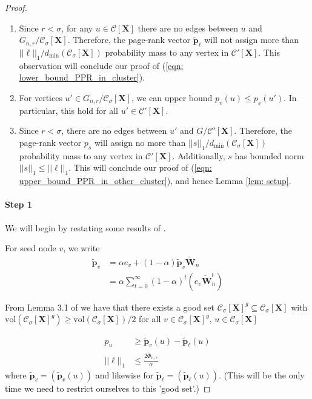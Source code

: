 \documentclass{article}
\newcommand{\vol}{\mathrm{vol}}
\newcommand{\1}{\mathbf{1}}
\newcommand{\pbf}{\mathbf{p}}
\newcommand{\Xbf}{\mathbf{X}}
\newcommand{\Wbf}{\mathbf{W}}
\newcommand{\Cset}{\mathcal{C}}
\newcommand{\Csig}{\Cset_{\sigma}}
\theoremstyle{aldenthm}
\begin{document}
\begin{proof}
\begin{enumerate}
		\item Since $r < \sigma$, for any $u \in \Cset[\Xbf]$ there are no edges between $u$ and $G_{n,r} / \Csig[\Xbf]$. Therefore, the page-rank vector $\widetilde{\pbf}_{\ell}$ will not assign more than $||\ell||_1 / d_{\min}(\Csig[\Xbf])$ probability mass to any vertex in $\Cset'[\Xbf]$. This observation will conclude our proof of (\ref{eqn: lower_bound_PPR_in_cluster}).
		\item For vertices $u' \in G_{n,r} / \Csig[\Xbf]$, we can upper bound $p_v(u) \leq p_s(u')$. In particular, this hold for all $u' \in \Cset'[\Xbf]$.
		\item Since $r < \sigma$, there are no edges between $u'$ and $G / \Cset'[\Xbf]$. Therefore, the page-rank vector $p_{s}$ will assign no more than $||s||_1 / d_{\min}(\Csig[\Xbf])$ probability mass to any vertex in $\Cset'[\Xbf]$. Additionally, $s$ has bounded norm $||s||_1 \leq ||\ell||_1$. This will conclude our proof of (\ref{eqn: upper_bound_PPR_in_other_cluster}), and hence Lemma \ref{lem: setup}.
	\end{enumerate}
	
	\paragraph{Step 1}
	We will begin by restating some results of \cite{zhu2013}.
	
	For seed node $v$, we write
	\begin{align} \label{eqn: page_rank_body}
	\widetilde{\pbf}_v & = \alpha e_v + (1 - \alpha) \widetilde{\pbf}_v \widetilde{\Wbf}_n \\
	& = \alpha \sum_{t = 0}^{\infty} (1 - \alpha)^t \left(e_v \widetilde{\Wbf}_n^t \right)
	\end{align}
	
	From Lemma 3.1 of \cite{zhu2013} we have that there exists a good set $\Csig[\Xbf]^g \subseteq \Csig[\Xbf]$ with $\vol(\Csig[\Xbf]^g) \geq \vol(\Csig[\Xbf])/2$ for all $v \in \Csig[\Xbf]^g$, $u \in \Csig[\Xbf]$
	
	\begin{align} \label{eqn: zhu_body}
	p_u & \geq \widetilde{\pbf}_v(u) - \widetilde{\pbf}_{\ell}(u) \nonumber \\
	||\ell||_1 & \leq \frac{2 \widetilde{\Phi}_{n,r}}{\alpha}
	\end{align}
	where $\widetilde{\pbf}_v = (\widetilde{\pbf}_v(u))$ and likewise for $\widetilde{\pbf}_{\ell} = (\widetilde{\pbf}_{\ell}(u))$. (This will be the only time we need to restrict ourselves to this 'good set'.)
	

\end{proof}
\end{document}
